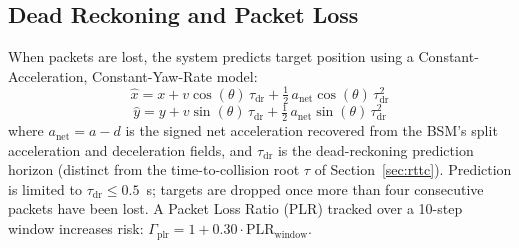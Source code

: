 \documentclass[sn-mathphys-num,Numbered,iicol]{sn-jnl}
\begin{document}
\subsection{Dead Reckoning and Packet Loss}\label{sec:dr}
When packets are lost, the system predicts target position using a Constant-Acceleration, Constant-Yaw-Rate model:
\begin{equation}
  \hat{x} = x + v\cos(\theta)\,\tau_{\mathrm{dr}} + \tfrac{1}{2}\,a_{\mathrm{net}}\cos(\theta)\,\tau_{\mathrm{dr}}^2
\end{equation}
\begin{equation}
  \hat{y} = y + v\sin(\theta)\,\tau_{\mathrm{dr}} + \tfrac{1}{2}\,a_{\mathrm{net}}\sin(\theta)\,\tau_{\mathrm{dr}}^2
\end{equation}
where $a_{\mathrm{net}} = a - d$ is the signed net acceleration recovered from the BSM's split acceleration and deceleration fields, and $\tau_{\mathrm{dr}}$ is the dead-reckoning prediction horizon (distinct from the time-to-collision root $\tau$ of Section~\ref{sec:rttc}). Prediction is limited to $\tau_{\mathrm{dr}} \le 0.5$~s; targets are dropped once more than four consecutive packets have been lost. A Packet Loss Ratio (PLR) tracked over a 10-step window increases risk: $\Gamma_{\mathrm{plr}} = 1 + 0.30 \cdot \mathrm{PLR}_{\mathrm{window}}$.
\end{document}
